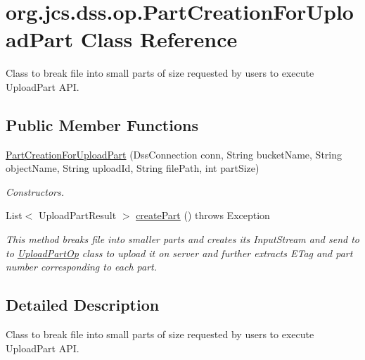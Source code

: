 \hypertarget{classorg_1_1jcs_1_1dss_1_1op_1_1PartCreationForUploadPart}{}\section{org.\+jcs.\+dss.\+op.\+Part\+Creation\+For\+Upload\+Part Class Reference}
\label{classorg_1_1jcs_1_1dss_1_1op_1_1PartCreationForUploadPart}


Class to break file into small parts of size requested by users to execute Upload\+Part A\+PI.  


\subsection*{Public Member Functions}
\begin{DoxyCompactItemize}
\item 
\hyperlink{classorg_1_1jcs_1_1dss_1_1op_1_1PartCreationForUploadPart_a4501ffcdcf569756434cb1edfb5e0679}{Part\+Creation\+For\+Upload\+Part} (Dss\+Connection conn, String bucket\+Name, String object\+Name, String upload\+Id, String file\+Path, int part\+Size)\hypertarget{classorg_1_1jcs_1_1dss_1_1op_1_1PartCreationForUploadPart_a4501ffcdcf569756434cb1edfb5e0679}{}\label{classorg_1_1jcs_1_1dss_1_1op_1_1PartCreationForUploadPart_a4501ffcdcf569756434cb1edfb5e0679}

\begin{DoxyCompactList}\small\item\em Constructors. \end{DoxyCompactList}\item 
List$<$ Upload\+Part\+Result $>$ \hyperlink{classorg_1_1jcs_1_1dss_1_1op_1_1PartCreationForUploadPart_aa57ac8879eb545556bf99f7456820461}{create\+Part} ()  throws Exception
\begin{DoxyCompactList}\small\item\em This method breaks file into smaller parts and creates its Input\+Stream and send to to \hyperlink{classorg_1_1jcs_1_1dss_1_1op_1_1UploadPartOp}{Upload\+Part\+Op} class to upload it on server and further extracts E\+Tag and part number corresponding to each part. \end{DoxyCompactList}\end{DoxyCompactItemize}


\subsection{Detailed Description}
Class to break file into small parts of size requested by users to execute Upload\+Part A\+PI. 

